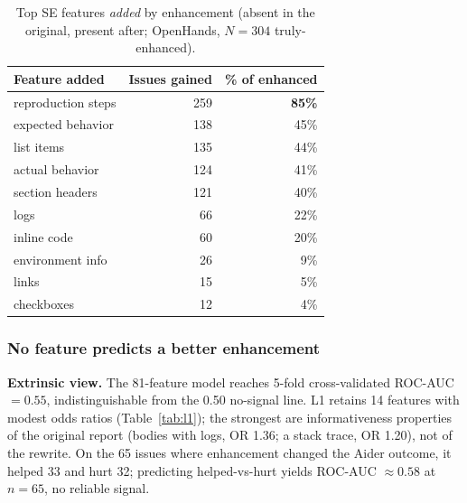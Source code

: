 \documentclass[journal]{IEEEtran}
\begin{document}
\begin{table}[t]
\centering
\caption{Top SE features \emph{added} by enhancement (absent in the original, present after; OpenHands, $N=304$ truly-enhanced).}
\label{tab:added}
\begin{tabular}{@{}lrr@{}}
\toprule
Feature added & Issues gained & \% of enhanced \\
\midrule
reproduction steps & 259 & \textbf{85\%} \\
expected behavior  & 138 & 45\% \\
list items         & 135 & 44\% \\
actual behavior    & 124 & 41\% \\
section headers    & 121 & 40\% \\
logs               & 66  & 22\% \\
inline code        & 60  & 20\% \\
environment info   & 26  & 9\%  \\
links              & 15  & 5\%  \\
checkboxes         & 12  & 4\%  \\
\bottomrule
\end{tabular}
\end{table}

\subsubsection{No feature predicts a better enhancement}
\textbf{Extrinsic view.} The 81-feature model reaches 5-fold cross-validated ROC-AUC $=0.55$, indistinguishable from the 0.50 no-signal line. L1 retains 14 features with modest odds ratios (Table~\ref{tab:l1}); the strongest are informativeness properties of the original report (bodies with logs, OR 1.36; a stack trace, OR 1.20), not of the rewrite. On the 65 issues where enhancement changed the Aider outcome, it helped 33 and hurt 32; predicting helped-vs-hurt yields ROC-AUC $\approx 0.58$ at $n=65$, no reliable signal.
\end{document}
